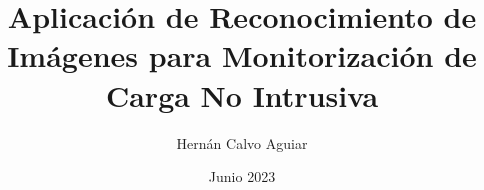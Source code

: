 \newcommand{\Estudios}{Grado}

\newcommand{\TituloEstudios}{Ingeniería Informática}

\newcommand{\Departamento}{Departamento de Inteligencia Artificial (DIA)}

\newcommand{\NombreAutor}{Hernán Calvo Aguiar}

\newcommand{\NombreTutor}{Esteban Garcia Cuesta}

\newcommand{\TituloTFG}{Aplicación de Reconocimiento de Imágenes para Monitorización de Carga No Intrusiva}

\newcommand{\Fecha}{Junio 2023}

\title{\TituloTFG}
\author{\NombreAutor}
\date{\Fecha}
